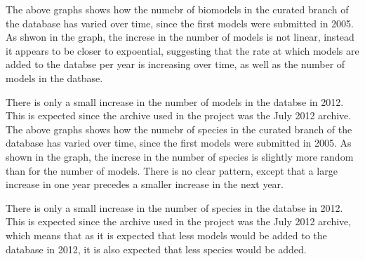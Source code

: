 \documentclass[portrait,a0paper,fontscale=0.35]{baposter}
\begin{document}
\begin{poster}
{\begin{multicols}{2}
 The above graphs shows how the numebr of biomodels in the curated branch of the database has varied over time, since  the first models were submitted in 2005. As shwon in the graph, the increse in the number of models is not linear, instead it appears to be closer to expoential, suggesting that the rate at which models are added to the databse per year is increasing over time, as well as the number of models in the datbase.
 
 There is only a small increase in the number of models in the databse in 2012. This is expected since the archive used in the project was the July 2012 archive.\\
 
 The above graphs shows how the numebr of species in the curated branch of the database has varied over time, since  the first models were submitted in 2005. As shown in the graph, the increse in the number of species is slightly more random than for the number of models. There is no clear pattern, except that a large increase in one year precedes a smaller increase in the next year.
 
 There is only a small increase in the number of species in the databse in 2012. This is expected since the archive used in the project was the July 2012 archive, which means that as it is expected that less models would be added to the database in 2012, it is also expected that less species would be added.\\
 
 \end{multicols}
 }
 
 

\end{poster}
\end{document}
